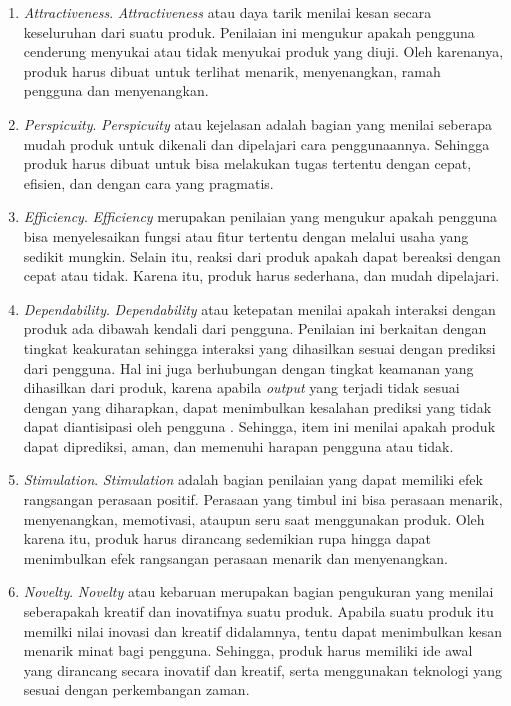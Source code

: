 \begin{enumerate}[nolistsep]
  \item\emph{Attractiveness}. \emph{Attractiveness} atau daya tarik menilai kesan secara keseluruhan dari suatu produk. Penilaian ini mengukur apakah pengguna cenderung menyukai atau tidak menyukai produk yang diuji. Oleh karenanya, produk harus dibuat untuk terlihat menarik, menyenangkan, ramah pengguna dan menyenangkan. 
  \item\emph{Perspicuity}. \emph{Perspicuity} atau kejelasan adalah bagian yang menilai seberapa mudah produk untuk dikenali dan dipelajari cara penggunaannya. Sehingga produk harus dibuat untuk bisa melakukan tugas tertentu dengan cepat, efisien, dan dengan cara yang pragmatis.
  \item\emph{Efficiency}. \emph{Efficiency} merupakan penilaian yang mengukur apakah pengguna bisa menyelesaikan fungsi atau fitur tertentu dengan melalui usaha yang sedikit mungkin. Selain itu, reaksi dari produk apakah dapat bereaksi dengan cepat atau tidak. Karena itu, produk harus sederhana, dan mudah dipelajari.
  \item\emph{Dependability}. \emph{Dependability} atau ketepatan menilai apakah interaksi dengan produk ada dibawah kendali dari pengguna. Penilaian ini berkaitan dengan tingkat keakuratan sehingga interaksi yang dihasilkan sesuai dengan prediksi dari pengguna. Hal ini juga berhubungan dengan tingkat keamanan yang dihasilkan dari produk, karena apabila \emph{output} yang terjadi tidak sesuai dengan yang diharapkan, dapat menimbulkan kesalahan prediksi yang tidak dapat diantisipasi oleh pengguna . Sehingga, item ini menilai apakah produk dapat diprediksi, aman, dan memenuhi harapan pengguna atau tidak.
  \item\emph{Stimulation}. \emph{Stimulation} adalah bagian penilaian yang dapat memiliki efek rangsangan perasaan positif. Perasaan yang timbul ini bisa perasaan menarik, menyenangkan, memotivasi, ataupun seru saat menggunakan produk. Oleh karena itu, produk harus dirancang sedemikian rupa hingga dapat menimbulkan efek rangsangan perasaan menarik dan menyenangkan.
  \item\emph{Novelty}. \emph{Novelty} atau kebaruan merupakan bagian pengukuran yang menilai seberapakah kreatif dan inovatifnya suatu produk. Apabila suatu produk itu memilki nilai inovasi dan kreatif didalamnya, tentu dapat menimbulkan kesan menarik minat bagi pengguna. Sehingga, produk harus memiliki ide awal yang dirancang secara inovatif dan kreatif, serta menggunakan teknologi yang sesuai dengan perkembangan zaman.
\end{enumerate}


